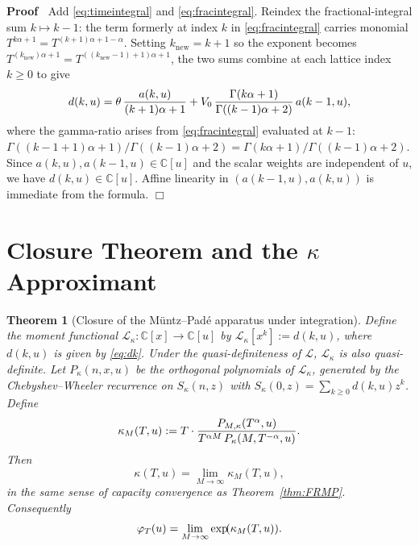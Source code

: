 \documentclass{article}
\newcommand{\assign}{:=}
\newenvironment{proof}{\noindent\textbf{Proof\ }}{\hspace*{\fill}$\Box$\medskip}
\newtheorem{theorem}{Theorem}
\newcommand{\C}{\mathbb{C}}
\newcommand{\Lk}{\mathcal{L}}
\newcommand{\Lkap}{\mathcal{L}_{\kappa}}
\begin{document}
\begin{proof}
  Add \eqref{eq:timeintegral} and \eqref{eq:fracintegral}. Reindex the
  fractional-integral sum $k \mapsto k - 1$: the term formerly at index $k$ in
  \eqref{eq:fracintegral} carries monomial $T^{k \alpha + 1} = T^{(k + 1)
  \alpha + 1 - \alpha}$. Setting $k_{\mathrm{new}} = k + 1$ so the exponent
  becomes $T^{(k_{\mathrm{new}}) \alpha + 1} = T^{((k_{\mathrm{new}} - 1) + 1)
  \alpha + 1}$, the two sums combine at each lattice index $k \ge 0$ to give
  \[ d (k, u) = \theta \hspace{0.17em} \frac{a (k, u)}{(k + 1) \alpha + 1} +
     V_0  \hspace{0.17em} \frac{\Gamma (k \alpha + 1)}{\Gamma ((k - 1) \alpha
     + 2)}  \hspace{0.17em} a (k - 1, u), \]
  where the gamma-ratio arises from \eqref{eq:fracintegral} evaluated at $k -
  1$: $\Gamma ((k - 1 + 1) \alpha + 1) / \Gamma ((k - 1) \alpha + 2) = \Gamma
  (k \alpha + 1) / \Gamma ((k - 1) \alpha + 2)$. Since $a (k, u), a (k - 1, u)
  \in \C [u]$ and the scalar weights are independent of $u$, we have $d (k, u)
  \in \C [u]$. Affine linearity in $(a (k - 1, u), a (k, u))$ is immediate
  from the formula.
\end{proof}

\section{Closure Theorem and the $\kappa$ Approximant}\label{sec:closure}

\begin{theorem}
  [Closure of the M{\"u}ntz--Pad{\'e} apparatus under
  integration]\label{thm:closure}Define the moment functional $\Lkap : \C [x]
  \to \C [u]$ by $\Lkap [x^k] \assign d (k, u)$, where $d (k, u)$ is given by
  \eqref{eq:dk}. Under the quasi-definiteness of $\Lk$, $\Lkap$ is also
  quasi-definite. Let $P_{\kappa} (n, x, u)$ be the orthogonal polynomials of
  $\Lkap$, generated by the Chebyshev--Wheeler recurrence on $S_{\kappa} (n,
  z)$ with $S_{\kappa} (0, z) = \sum_{k \ge 0} d (k, u) z^k$. Define
  \begin{equation}
    \kappa_M (T, u) \assign T \cdot \frac{P_{M, \kappa} (T^{\alpha},
    u)}{T^{\alpha M}  \hspace{0.17em} P_{\kappa} (M, T^{- \alpha}, u)} .
    \label{eq:kappaM}
  \end{equation}
  Then
  \begin{equation}
    \kappa (T, u) = \lim_{M \to \infty} \kappa_M (T, u),
    \label{eq:kappaconvergence}
  \end{equation}
  in the same sense of capacity convergence as  Theorem~\ref{thm:FRMP}.
  Consequently
  \begin{equation}
    \varphi_T (u) = \lim_{M \to \infty} \exp \hspace{-0.17em} (\kappa_M (T,
    u)) . \label{eq:phiconvergence}
  \end{equation}
\end{theorem}
\end{document}
